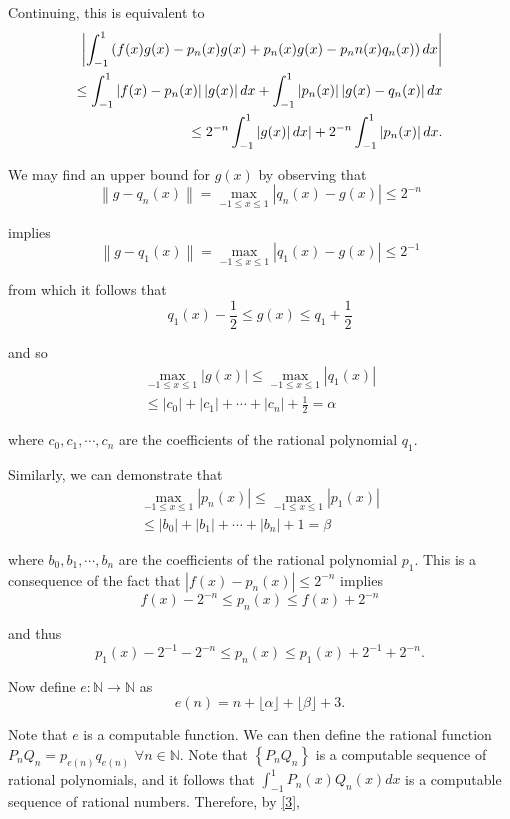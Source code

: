 \documentclass[a4paper,10pt]{article}
\begin{document}
Continuing, this is equivalent to
\begin{align}
\left|\int_{-1}^{1}\left(f(x)g(x) - p_{n}(x)g(x) + p_{n}(x)g(x) - p_n{n}(x)q_{n}(x)\right)dx\right| \notag \\
\leq \int_{-1}^{1}\left|f(x) - p_{n}(x)\right| \left|g(x)\right|dx + \int_{-1}^{1}\left|p_{n}(x)\right| \left|g(x) - q_{n}(x)\right|dx \notag \\
\leq 2^{-n}\int_{-1}^{1}\left|g(x)\right|dx | +  2^{-n}\int_{-1}^{1}\left|p_{n}(x)\right|dx \label{3}.
\end{align}

We may find an upper bound for $g(x)$ by observing that
\[\left\|g - q_{n}(x)\right\| = \max_{-1\leq x \leq1} \left|q_{n}(x) - g(x)\right| \leq 2^{-n}\]

implies
\[\left\|g - q_{1}(x)\right\| = \max_{-1\leq x \leq1} \left|q_{1}(x) - g(x)\right| \leq 2^{-1}\]

from which it follows that
\[q_{1}(x) - \frac{1}{2} \leq g(x) \leq q_{1} + \frac{1}{2}\]

and so
\begin{align*}
\max_{-1 \leq x \leq 1}\left|g(x)\right| \leq \max_{-1\leq x \leq 1}\left|q_{1}(x)\right| \\
\leq \left|c_{0}\right| + \left|c_{1}\right| + \cdots + \left|c_{n}\right| + \frac{1}{2} = \alpha
\end{align*}

where $c_{0}, c_{1}, \cdots, c_{n}$ are the coefficients of the rational polynomial $q_{1}$.

Similarly, we can demonstrate that
\begin{align*}
\max_{-1 \leq x \leq 1}\left|p_{n}(x)\right| \leq \max_{-1\leq x \leq 1}\left|p_{1}(x)\right| \\
\leq \left|b_{0}\right| + \left|b_{1}\right| + \cdots + \left|b_{n}\right| + 1 = \beta
\end{align*}

where $b_{0}, b_{1}, \cdots, b_{n}$ are the coefficients of the rational polynomial $p_{1}$.  This is a consequence of the fact that $\left|f(x) - p_{n}(x)\right| \leq 2^{-n}$ implies
\[f(x) - 2^{-n} \leq p_{n}(x) \leq f(x) + 2^{-n}\]

and thus
\[p_{1}(x) - 2^{-1} - 2^{-n} \leq p_{n}(x) \leq p_{1}(x) + 2^{-1} + 2^{-n}.\]

Now define $e:\mathbb{N} \to \mathbb{N}$ as
\[e(n) = n + \lfloor\alpha\rfloor + \lfloor\beta\rfloor + 3.\]

Note that $e$ is a computable function.  We can then define the rational function $P_{n}Q_{n} = p_{e(n)}q_{e(n)}$ $\forall n \in \mathbb{N}$.  Note that $\left\{P_{n}Q_{n}\right\}$ is a computable sequence of rational polynomials, and it follows that
$\displaystyle\int_{-1}^{1}P_{n}(x)Q_{n}(x)dx$ is a computable sequence of rational numbers.  Therefore, by \eqref{3},
\end{document}
